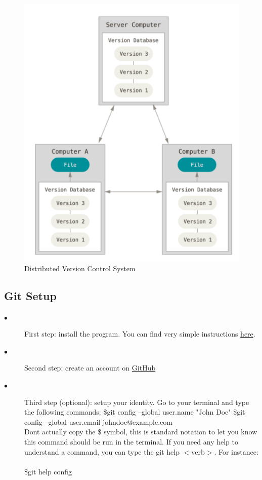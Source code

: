 \documentclass[12pt]{article}
\begin{document}
	\begin{figure}[t]
	\caption{Distributed Version Control System}
	\includegraphics[scale=0.5]{figure1}
	\centering
    \end{figure}

\subsection{Git Setup}
    \begin{description}
    \item[$\bullet$] First step: install the program. You can find very simple instructions \href{https://git-scm.com/book/en/v2/Getting-Started-Installing-Git}{here}. 
    \item[$\bullet$] Second step: create an account on \href{https://github.com}{GitHub}
    \item[$\bullet$] Third step (optional): setup your identity. Go to your terminal and type the following commands:
    \newline
    \newline
    \indent \$git config --global user.name "John Doe"
    \newline
    \newline
    \indent \$git config --global user.email johndoe@example.com \\
    
    Don\textquotesingle t actually copy the \$ symbol, this is standard notation to let you know this command should be run in the terminal. If you need any help to understand a command, you can type the git help $<$verb$>$. For instance: \\
    \\
    \indent \$git help config
    
    \end{description}
\end{document}
